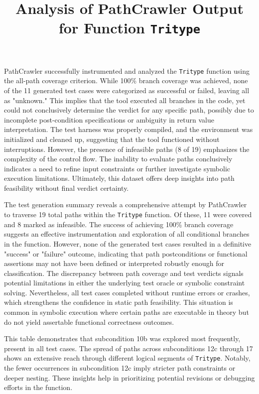 \documentclass[12pt]{article}
\title{Analysis of PathCrawler Output for Function \texttt{Tritype}}
\date{}
\begin{document}
\maketitle

PathCrawler successfully instrumented and analyzed the \texttt{Tritype} function using the all-path coverage criterion. While 100\% branch coverage was achieved, none of the 11 generated test cases were categorized as successful or failed, leaving all as "unknown." This implies that the tool executed all branches in the code, yet could not conclusively determine the verdict for any specific path, possibly due to incomplete post-condition specifications or ambiguity in return value interpretation. The test harness was properly compiled, and the environment was initialized and cleaned up, suggesting that the tool functioned without interruptions. However, the presence of infeasible paths (8 of 19) emphasizes the complexity of the control flow. The inability to evaluate paths conclusively indicates a need to refine input constraints or further investigate symbolic execution limitations. Ultimately, this dataset offers deep insights into path feasibility without final verdict certainty.

The test generation summary reveals a comprehensive attempt by PathCrawler to traverse 19 total paths within the \texttt{Tritype} function. Of these, 11 were covered and 8 marked as infeasible. The success of achieving 100\% branch coverage suggests an effective instrumentation and exploration of all conditional branches in the function. However, none of the generated test cases resulted in a definitive "success" or "failure" outcome, indicating that path postconditions or functional assertions may not have been defined or interpreted robustly enough for classification. The discrepancy between path coverage and test verdicts signals potential limitations in either the underlying test oracle or symbolic constraint solving. Nevertheless, all test cases completed without runtime errors or crashes, which strengthens the confidence in static path feasibility. This situation is common in symbolic execution where certain paths are executable in theory but do not yield assertable functional correctness outcomes.

This table demonstrates that subcondition 10b was explored most frequently, present in all test cases. The spread of paths across subconditions 12c through 17 shows an extensive reach through different logical segments of \texttt{Tritype}. Notably, the fewer occurrences in subcondition 12c imply stricter path constraints or deeper nesting. These insights help in prioritizing potential revisions or debugging efforts in the function.
\end{document}
